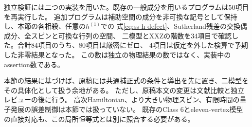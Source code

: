 独立検証には二つの実装を用いた。既存の一般成分を用いるプログラムは50項目を再実行した。
追加プログラムは補助空間の成分を非可換な記号として保持し、本節の各相殺、任意の$h^{(1)}$での
式\eqref{eq:ss-h-defect}、Sutherland残差の交換偶成分、全スピンと可換な行列の空間、
二模型とXXZの階数を34項目で確認した。合計84項目のうち、80項目は厳密にゼロ、
4項目は仮定を外した検算で予期した非零結果となった。
この数は独立の物理結果の数ではなく、実装中のassertion数である。

本節の結果に基づけば、原稿には共通補正式の条件と導出を先に置き、二模型をその具体化として扱う余地がある。
ただし、原稿本文の変更は文献比較と独立レビューの後に行う。
高次Hamiltonian、より大きい物理スピン、有限時間の量子発展の誤差制御は本節では扱っていない。
既存のClass 6とeleven-vertex模型の直接対応も、この局所恒等式とは別に照合する必要がある。
